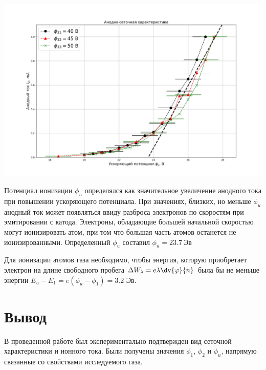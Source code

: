 \begin{minipage}{\linewidth}
    \centering
    \includegraphics[width=\linewidth]{fig/2.png}    
\end{minipage}

Потенциал ионизации $\phi_u$ определялся как значительное увеличение анодного тока при повышении ускоряющего
потенциала. При значениях, близких, но меньше $\phi_u$ анодный ток может появляться ввиду разброса электронов по
скоростям при эмитировании с катода. Электроны, обладающие большей начальной скоростью могут ионизировать атом, при том
что большая часть атомов останется не ионизированными. Определенный $\phi_u$ составил $\phi_u=23.7\ \text{Эв}$ 

Для ионизации атомов газа необходимо, чтобы энергия, которую приобретает электрон на длине свободного пробега $\Delta W_{\lambda}=e\lambda \displaystyle\dv{\phi}{n}$
была бы не меньше энергии $E_u-E_1=e(\phi_u-\phi_1)=3.2\text{ Эв}.$ 


\section{Вывод}
В проведенной работе был экспериментально подтвержден вид сеточной характеристики и ионного тока. Были получены значения
$\phi_1$, $\phi_2$ и $\phi_u$, напрямую связанные со свойствами исследуемого газа.
